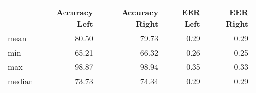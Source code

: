 \begin{tabular}{lrrrr}
\toprule
{} &  Accuracy Left &  Accuracy Right &  EER Left &  EER Right \\
\midrule
mean   &          80.50 &           79.73 &      0.29 &       0.29 \\
min    &          65.21 &           66.32 &      0.26 &       0.25 \\
max    &          98.87 &           98.94 &      0.35 &       0.33 \\
median &          73.73 &           74.34 &      0.29 &       0.29 \\
\bottomrule
\end{tabular}
